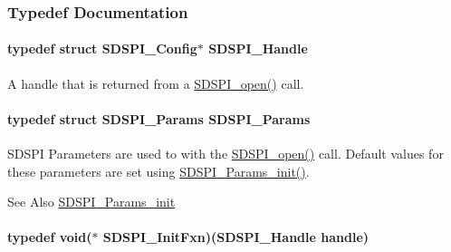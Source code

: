 \subsubsection{Typedef Documentation}
\paragraph[{S\-D\-S\-P\-I\-\_\-\-Handle}]{\setlength{\rightskip}{0pt plus 5cm}typedef struct {\bf S\-D\-S\-P\-I\-\_\-\-Config}$\ast$ {\bf S\-D\-S\-P\-I\-\_\-\-Handle}}\label{_s_d_s_p_i_8h_abd3d22133d60c2e5afd49722d6bafb7e}


A handle that is returned from a \hyperlink{_s_d_s_p_i_8h_af4a5ca9bb35e8a7df02acf20ceeae66d}{S\-D\-S\-P\-I\-\_\-open()} call. 

\paragraph[{S\-D\-S\-P\-I\-\_\-\-Params}]{\setlength{\rightskip}{0pt plus 5cm}typedef struct {\bf S\-D\-S\-P\-I\-\_\-\-Params}  {\bf S\-D\-S\-P\-I\-\_\-\-Params}}\label{_s_d_s_p_i_8h_a3fd9e0fa28415b0c0cf6ab03c37ca4d1}


S\-D\-S\-P\-I Parameters are used to with the \hyperlink{_s_d_s_p_i_8h_af4a5ca9bb35e8a7df02acf20ceeae66d}{S\-D\-S\-P\-I\-\_\-open()} call. Default values for these parameters are set using \hyperlink{_s_d_s_p_i_8h_a6fe24eaba1cca88242c5df360a074ca8}{S\-D\-S\-P\-I\-\_\-\-Params\-\_\-init()}. 

\begin{DoxySeeAlso}{See Also}
\hyperlink{_s_d_s_p_i_8h_a6fe24eaba1cca88242c5df360a074ca8}{S\-D\-S\-P\-I\-\_\-\-Params\-\_\-init} 
\end{DoxySeeAlso}
\paragraph[{S\-D\-S\-P\-I\-\_\-\-Init\-Fxn}]{\setlength{\rightskip}{0pt plus 5cm}typedef void($\ast$ S\-D\-S\-P\-I\-\_\-\-Init\-Fxn)({\bf S\-D\-S\-P\-I\-\_\-\-Handle} handle)}\label{_s_d_s_p_i_8h_a3171d9675e245720a8552f667e33ba54}


